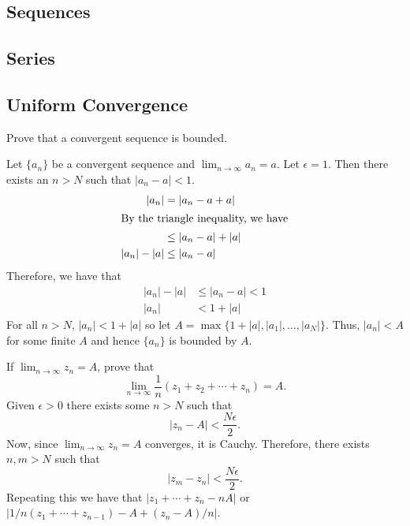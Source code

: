 \subsection{Sequences}

\subsection{Series}

\subsection{Uniform Convergence}

\begin{exercise}
\item
  Prove that a convergent sequence is bounded.
  \par\smallskip
  Let \(\{a_n\}\) be a convergent sequence and \(\lim_{n\to\infty}a_n = a\).
  Let \(\epsilon = 1\).
  Then there exists an \(n > N\) such that \(\lvert a_n - a\rvert < 1\).
  \begin{align*}
    \lvert a_n\rvert & = \lvert a_n - a + a\rvert\\
    \intertext{By the triangle inequality, we have}
                     & \leq \lvert a_n - a\rvert + \lvert a\rvert\\
    \lvert a_n\rvert - \lvert a\rvert & \leq \lvert a_n - a\rvert
  \end{align*}
  Therefore, we have that
  \begin{align*}
    \lvert a_n\rvert - \lvert a\rvert & \leq\lvert a_n - a\rvert < 1\\
    \lvert a_n\rvert & < 1 + \lvert a\rvert
  \end{align*}
  For all \(n > N\), \(\lvert a_n\rvert < 1 + \lvert a\rvert\) so let
  \(A = \max\bigl\{1 + \lvert a\rvert,\lvert a_1\rvert,\ldots,
  \lvert a_N\rvert\bigr\}\).
  Thus, \(\lvert a_n\rvert < A\) for some finite \(A\) and hence \(\{a_n\}\) is
  bounded by \(A\).
\item
  If \(\lim_{n\to\infty}z_n = A\), prove that
  \[
  \lim_{n\to\infty}\frac{1}{n}(z_1 + z_2 + \cdots + z_n) = A.
  \]
  Given \(\epsilon > 0\) there exists some \(n > N\) such that
  \[
  \lvert z_n - A\rvert < \frac{N\epsilon}{2}.
  \]
  Now, since \(\lim_{n\to\infty}z_n = A\) converges, it is Cauchy.
  Therefore, there exists \(n,m > N\) such that
  \[
  \lvert z_m - z_n\rvert < \frac{N\epsilon}{2}.
  \]
  Repeating this we have that \(\lvert z_1 + \cdots + z_n - nA\rvert\) or
  \(\lvert 1/n(z_1 + \cdots + z_{n - 1}) - A + (z_n - A)/n\rvert\).

\end{exercise}
